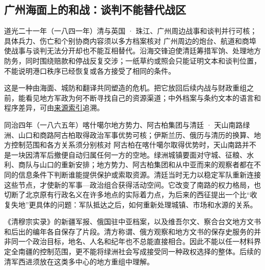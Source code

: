 \subsection{广州海面上的和战：谈判不能替代战区}
\begin{event}{}{道光二十一年（一八四一年）}{清与英国 · 珠江、广州周边}{战事和谈判并行可核；具体兵力、伤亡和个别协商内容须以多方档案核对}
广州周边的炮台、航道和商埠使战事与谈判无法分开却也不能互相替代。沿海交锋迫使清廷筹措军饷、处理地方防务，同时围绕赔款和停战反复交涉；一纸草约或照会只能证明文本和谈判位置，不能说明港口秩序已经恢复或各方接受了相同的条件。

这是一种由海面、城防和翻译共同塑造的危机。把它放回后续内战与财政重组之前，能看见地方军政为何不断寻找自己的资源渠道；中外档案与条约文本的语言和程序差异，可由\hyperref[app:sources]{来源索引}追溯。
\end{event}

\begin{event}{}{同治四年（一八六五年）}{喀什噶尔地方势力、阿古柏集团与清廷 · 天山南路绿洲、山口和商路}{阿古柏取得政治军事优势可核；伊斯兰历、俄历与清历的换算、地方控制范围和各方关系须分别核对}
阿古柏在喀什噶尔取得优势时，天山南路并不是一块因清军后撤便自动归属任何一方的空地。绿洲城镇要面对守城、征粮、水利、商队与山口的重新安排；地方势力、阿古柏集团和从中亚而来的观察者都在不同的信息条件下判断谁能提供保护或索取资源。清廷当时无力以稳定军队重新连接这些节点，才使新的军事—政治组合获得活动空间。它改变了南路的权力格局，也切断了北京原有行政名义在许多地点的实际着力点，为后来的西征提出一个比“收复失地”更具体的问题：军队抵达之后，如何重新处理城镇、市场和水源的关系。

《清穆宗实录》的新疆军报、俄国驻中亚档案，以及维吾尔文、察合台文地方文书和后出的编年各自保存了片段。清方称谓、俄方观察和地方文书的保存史服务的并非同一个政治目标，地名、人名和纪年也不总能直接相合。因此不能以任一材料界定全南疆的控制范围，更不能将绿洲社会写成接受同一种政权选择的整体。后续的清军西进须放在这类多中心的地方重组中理解。
\end{event}

